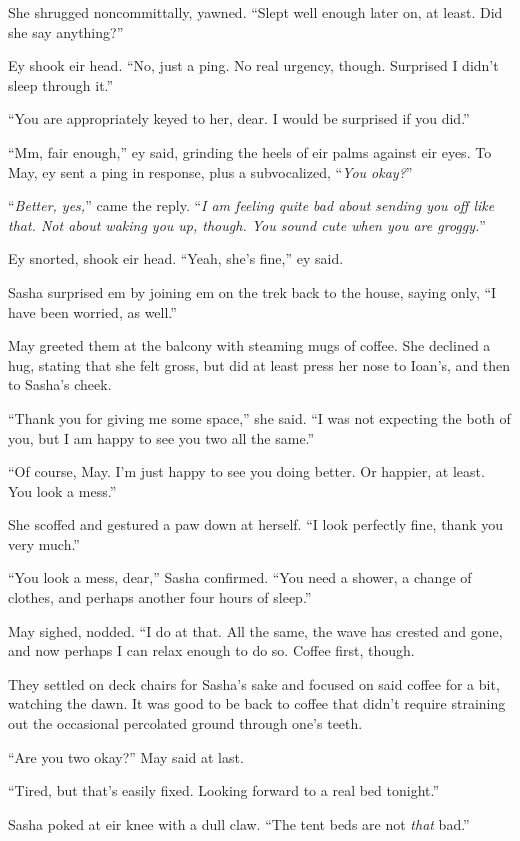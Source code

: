 She shrugged noncommittally, yawned. ``Slept well enough later on, at least. Did she say anything?''

Ey shook eir head. ``No, just a ping. No real urgency, though. Surprised I didn't sleep through it.''

``You are appropriately keyed to her, dear. I would be surprised if you did.''

``Mm, fair enough,'' ey said, grinding the heels of eir palms against eir eyes. To May, ey sent a ping in response, plus a subvocalized, ``\emph{You okay?}''

``\emph{Better, yes,}'' came the reply. ``\emph{I am feeling quite bad about sending you off like that. Not about waking you up, though. You sound cute when you are groggy.}''

Ey snorted, shook eir head. ``Yeah, she's fine,'' ey said.

Sasha surprised em by joining em on the trek back to the house, saying only, ``I have been worried, as well.''

May greeted them at the balcony with steaming mugs of coffee. She declined a hug, stating that she felt gross, but did at least press her nose to Ioan's, and then to Sasha's cheek.

``Thank you for giving me some space,'' she said. ``I was not expecting the both of you, but I am happy to see you two all the same.''

``Of course, May. I'm just happy to see you doing better. Or happier, at least. You look a mess.''

She scoffed and gestured a paw down at herself. ``I look perfectly fine, thank you very much.''

``You look a mess, dear,'' Sasha confirmed. ``You need a shower, a change of clothes, and perhaps another four hours of sleep.''

May sighed, nodded. ``I do at that. All the same, the wave has crested and gone, and now perhaps I can relax enough to do so. Coffee first, though.

They settled on deck chairs for Sasha's sake and focused on said coffee for a bit, watching the dawn. It was good to be back to coffee that didn't require straining out the occasional percolated ground through one's teeth.

``Are you two okay?'' May said at last.

``Tired, but that's easily fixed. Looking forward to a real bed tonight.''

Sasha poked at eir knee with a dull claw. ``The tent beds are not \emph{that} bad.''

